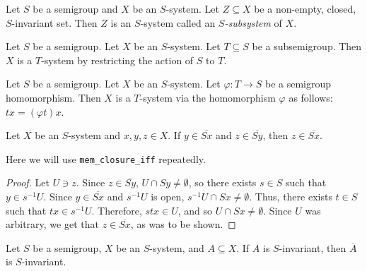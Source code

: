 \begin{definition}[Subsystem]
    \label{def_subsystem}
    \leanok{}
    Let $S$ be a semigroup and $X$ be an $S$-system.  Let $Z \subseteq X$ be a non-empty, closed, $S$-invariant set.  Then $Z$ is an $S$-system called an \emph{$S$-subsystem} of $X$.
\end{definition}

\begin{definition}
\label{def_subsemi_system}
    Let $S$ be a semigroup.  Let $X$ be an $S$-system. Let $T \subseteq S$ be a subsemigroup. Then $X$ is a $T$-system by restricting the action of $S$ to $T$.
\end{definition}

\begin{definition}
\label{def_hom_system}
\leanok{}
    Let $S$ be a semigroup.  Let $X$ be an $S$-system.  Let $\varphi: T \to S$ be a semigroup homomorphism.  Then $X$ is a $T$-system via the homomorphism $\varphi$ as follows: $tx = (\varphi t)x$.
\end{definition}

\begin{theorem}
\label{theorem_orbit_closure_transitivity}
\leanok{}
    Let $X$ be an $S$-system and $x,y,z \in X$. If $y \in \overline{Sx}$ and $z \in \overline{Sy}$, then $z \in \overline{Sx}$.
\end{theorem}

\begin{leanrmk}
    Here we will use \verb|mem_closure_iff| repeatedly.
\end{leanrmk}

\begin{proof}
\leanok{}
    Let $U \ni z$.  Since $z \in \overline{Sy}$, $U \cap Sy \neq \emptyset$, so there exists $s \in S$ such that $y \in s^{-1}U$.  Since $y \in \overline{Sx}$ and $s^{-1}U$ is open, $s^{-1} U \cap Sx \neq \emptyset$.  Thus, there exists $t \in S$ such that $tx \in s^{-1} U$.  Therefore, $stx \in U$, and so $U \cap Sx \neq \emptyset$.  Since $U$ was arbitrary, we get that $z \in \overline{Sx}$, as was to be shown.
\end{proof}

\begin{lemma}
\label{lemma_closure_of_inv_is_inv}
\leanok{}
    Let $S$ be a semigroup, $X$ be an $S$-system, and $A \subseteq X$.  If $A$ is $S$-invariant, then $\overline{A}$ is $S$-invariant.
\end{lemma}

